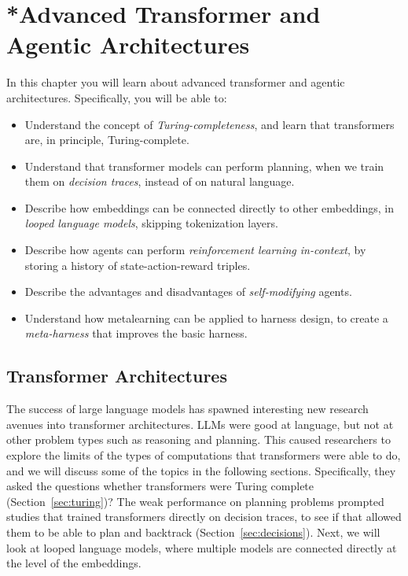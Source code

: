 


\chapter[*Advanced Agentic Architectures]{*Advanced Transformer and Agentic Architectures}\label{chap:arch}

\begin{learningbox}
In this chapter you will learn about advanced transformer and agentic architectures. Specifically, you 
will be able to:
\begin{itemize}[leftmargin=*, nosep]
    \item Understand the concept of {\em Turing-completeness}, and learn that transformers are, in principle, Turing-complete.
    \item Understand that transformer models can perform planning, when we train them on {\em decision traces}, instead of on natural language. 
    \item Describe how embeddings can be connected directly to other embeddings, in {\em looped language models}, skipping tokenization layers. 
    \item Describe how agents can perform {\em reinforcement learning in-context}, by storing a history of state-action-reward triples.
    \item Describe the advantages and disadvantages of {\em self-modifying} agents. 
    \item Understand how metalearning can be applied to harness design, to create a {\em meta-harness} that improves the basic harness.
\end{itemize}
\end{learningbox}

\section{Transformer Architectures}
The success of large language models has spawned interesting new research avenues into transformer architectures. LLMs were good at language, but not at other problem types such as reasoning and planning. This caused researchers to explore the limits of the types of computations that transformers were able to do, and we will discuss some of the topics in the following sections. Specifically, they asked the questions whether transformers were Turing complete (Section~\ref{sec:turing})? The weak performance on planning problems prompted studies that trained transformers directly on decision traces, to see if that allowed them to be able to plan and backtrack (Section~\ref{sec:decisions}). Next, we will look at looped language models, where multiple models are connected directly at the level of the embeddings. 


